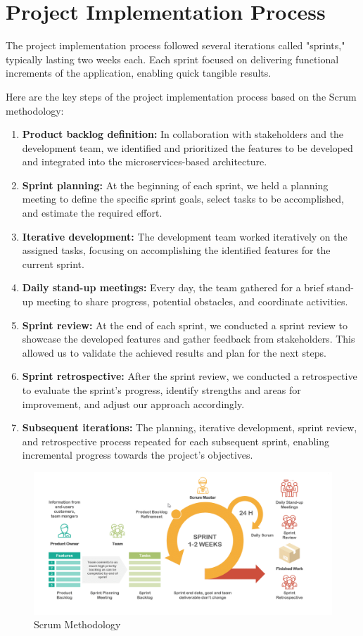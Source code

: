 \section{Project Implementation Process}

The project implementation process followed several iterations called "sprints," typically lasting two weeks each. Each sprint focused on delivering functional increments of the application, enabling quick tangible results.

Here are the key steps of the project implementation process based on the Scrum methodology:

\begin{enumerate}
\item \textbf{Product backlog definition:} In collaboration with stakeholders and the development team, we identified and prioritized the features to be developed and integrated into the microservices-based architecture.
\item \textbf{Sprint planning:} At the beginning of each sprint, we held a planning meeting to define the specific sprint goals, select tasks to be accomplished, and estimate the required effort.
\item \textbf{Iterative development:} The development team worked iteratively on the assigned tasks, focusing on accomplishing the identified features for the current sprint.
\item \textbf{Daily stand-up meetings:} Every day, the team gathered for a brief stand-up meeting to share progress, potential obstacles, and coordinate activities.
\item \textbf{Sprint review:} At the end of each sprint, we conducted a sprint review to showcase the developed features and gather feedback from stakeholders. This allowed us to validate the achieved results and plan for the next steps.
\item \textbf{Sprint retrospective:} After the sprint review, we conducted a retrospective to evaluate the sprint's progress, identify strengths and areas for improvement, and adjust our approach accordingly.
\item \textbf{Subsequent iterations:} The planning, iterative development, sprint review, and retrospective process repeated for each subsequent sprint, enabling incremental progress towards the project's objectives.
\end{enumerate}

\begin{figure}[H]
\centering
\includegraphics[width=\linewidth]{images/scrum.png}
\caption{Scrum Methodology}\label{fig:scrum}
\end{figure}

